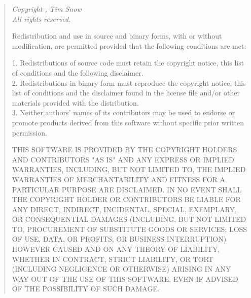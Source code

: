 \documentclass[a4paper]{article}
\begin{document}
			\begin{quote}
				{\it
					Copyright , Tim Snow\\
					All rights reserved.

					Redistribution and use in source and binary forms, with or without modification, are permitted provided that the following conditions are met:

					1. Redistributions of source code must retain the copyright notice, this list of conditions and the following disclaimer.\\
					2. Redistributions in binary form must reproduce the copyright notice, this list of conditions and the disclaimer found in the license file and/or other materials provided with the distribution.\\
					3. Neither authors' names of its contributors may be used to endorse or promote products derived from this software without specific prior written permission.

					THIS SOFTWARE IS PROVIDED BY THE COPYRIGHT HOLDERS AND CONTRIBUTORS "AS IS" AND ANY EXPRESS OR IMPLIED WARRANTIES, INCLUDING, BUT NOT LIMITED TO, THE IMPLIED WARRANTIES OF MERCHANTABILITY AND FITNESS FOR A PARTICULAR PURPOSE ARE DISCLAIMED. IN NO EVENT SHALL THE COPYRIGHT HOLDER OR CONTRIBUTORS BE LIABLE FOR ANY DIRECT, INDIRECT, INCIDENTAL, SPECIAL, EXEMPLARY, OR CONSEQUENTIAL DAMAGES (INCLUDING, BUT NOT LIMITED TO, PROCUREMENT OF SUBSTITUTE GOODS OR SERVICES; LOSS OF USE, DATA, OR PROFITS; OR BUSINESS INTERRUPTION) HOWEVER CAUSED AND ON ANY THEORY OF LIABILITY, WHETHER IN CONTRACT, STRICT LIABILITY, OR TORT (INCLUDING NEGLIGENCE OR OTHERWISE) ARISING IN ANY WAY OUT OF THE USE OF THIS SOFTWARE, EVEN IF ADVISED OF THE POSSIBILITY OF SUCH DAMAGE.
				}
			\end{quote}
\end{document}
